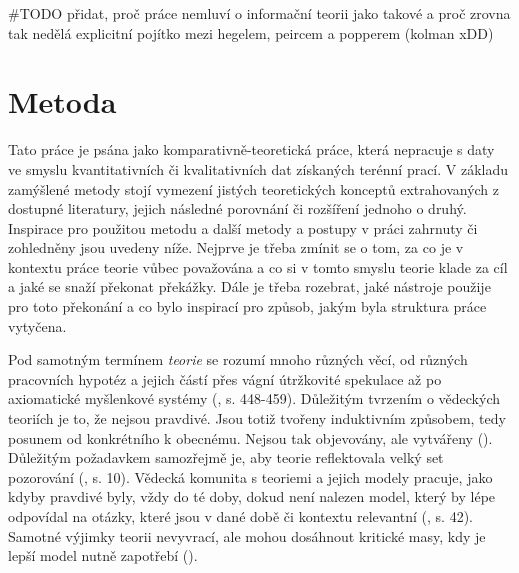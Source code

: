 \documentclass[11pt,a4paper]{article}
\begin{document}
#TODO přidat, proč práce nemluví o informační teorii jako takové a proč zrovna tak nedělá explicitní pojítko mezi hegelem, peircem a popperem (kolman xDD)



\pagebreak


\section*{Metoda}

Tato práce je psána jako komparativně-teoretická práce, která nepracuje s daty ve smyslu kvantitativních či kvalitativních dat získaných terénní prací. V základu zamýšlené metody stojí vymezení jistých teoretických konceptů extrahovaných z dostupné literatury, jejich následné porovnání či rozšíření jednoho o druhý. Inspirace pro použitou metodu a další metody a postupy v práci zahrnuty či zohledněny jsou uvedeny níže. Nejprve je třeba zmínit se o tom, za co je v kontextu práce teorie vůbec považována a co si v tomto smyslu teorie klade za cíl a jaké se snaží překonat překážky. Dále je třeba rozebrat, jaké nástroje použije pro toto překonání a co bylo inspirací pro způsob, jakým byla struktura práce vytyčena.

Pod samotným termínem \textit{teorie} se rozumí mnoho různých věcí, od různých pracovních hypotéz a jejich částí přes vágní útržkovité spekulace až po axiomatické myšlenkové systémy (\cite{calhoun_sociological_2007}, s. 448-459). Důležitým tvrzením o vědeckých teoriích je to, že nejsou pravdivé. Jsou totiž tvořeny induktivním způsobem, tedy posunem od konkrétního k obecnému. Nejsou tak objevovány, ale vytvářeny (\cite{mintzberg_developing_2014}). Důležitým požadavkem samozřejmě je, aby teorie reflektovala velký set pozorování (\cite{hawking_brief_1998}, s. 10). Vědecká komunita s teoriemi a jejich modely pracuje, jako kdyby pravdivé byly, vždy do té doby, dokud není nalezen model, který by lépe odpovídal na otázky, které jsou v dané době či kontextu relevantní (\cite{barbara_m_wildemuth_questions_2017}, s. 42). Samotné výjimky teorii nevyvrací, ale mohou dosáhnout kritické masy, kdy je lepší model nutně zapotřebí (\cite{kuhn_structure_2012}).
\end{document}
